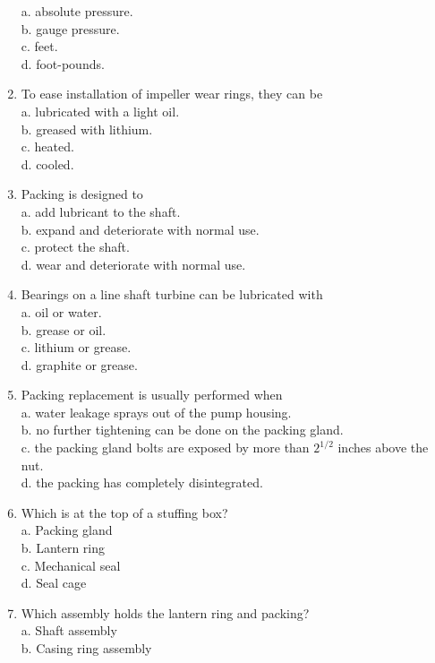 \begin{enumerate}[1.]
a. absolute pressure.\\
b. gauge pressure.\\
c. feet.\\
d. foot-pounds.\\
\item To ease installation of impeller wear rings, they can be\\
a. lubricated with a light oil.\\
b. greased with lithium.\\
c. heated.\\
d. cooled.\\
\item Packing is designed to\\
a. add lubricant to the shaft.\\
b. expand and deteriorate with normal use.\\
c. protect the shaft.\\
d. wear and deteriorate with normal use.\\
\item Bearings on a line shaft turbine can be lubricated with\\
a. oil or water.\\
b. grease or oil.\\
c. lithium or grease.\\
d. graphite or grease.\\
\item Packing replacement is usually performed when\\
a. water leakage sprays out of the pump housing.\\
b. no further tightening can be done on the packing gland.\\
c. the packing gland bolts are exposed by more than $2^{1 / 2}$ inches above the nut.\\
d. the packing has completely disintegrated.\\
\item Which is at the top of a stuffing box?\\
a. Packing gland\\
b. Lantern ring\\
c. Mechanical seal\\
d. Seal cage\\
\item Which assembly holds the lantern ring and packing?\\
a. Shaft assembly\\
b. Casing ring assembly\\

\end{enumerate}
